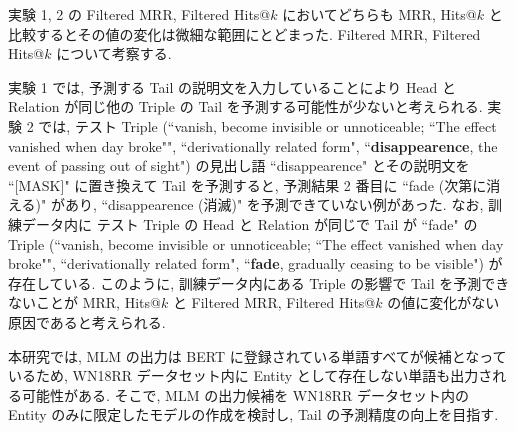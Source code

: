 実験 1, 2 の Filtered MRR, Filtered Hits@$k$ においてどちらも MRR, Hits@$k$ と比較するとその値の変化は微細な範囲にとどまった. Filtered MRR, Filtered Hits@$k$ について考察する. \par
実験 1 では, 予測する Tail の説明文を入力していることにより Head と Relation が同じ他の Triple の Tail を予測する可能性が少ないと考えられる. 実験 2 では, テスト Triple (``vanish, become invisible or unnoticeable; ``The effect vanished when day broke"", ``derivationally related form", ``\textbf{disappearence}, the event of passing out of sight") の見出し語 ``disappearence" とその説明文を ``[MASK]" に置き換えて Tail を予測すると, 予測結果 2 番目に ``fade (次第に消える)" があり, ``disappearence (消滅)" を予測できていない例があった. なお, 訓練データ内に テスト Triple の Head と Relation が同じで Tail が ``fade" の Triple (``vanish, become invisible or unnoticeable; ``The effect vanished when day broke"", ``derivationally related form", ``\textbf{fade}, gradually ceasing to be visible") が存在している. このように, 訓練データ内にある Triple の影響で Tail を予測できないことが MRR, Hits@$k$ と Filtered MRR, Filtered Hits@$k$ の値に変化がない原因であると考えられる. \par
本研究では, MLM の出力は BERT に登録されている単語すべてが候補となっているため, WN18RR データセット内に Entity として存在しない単語も出力される可能性がある. そこで, MLM の出力候補を WN18RR データセット内の Entity のみに限定したモデルの作成を検討し, Tail の予測精度の向上を目指す. \par
